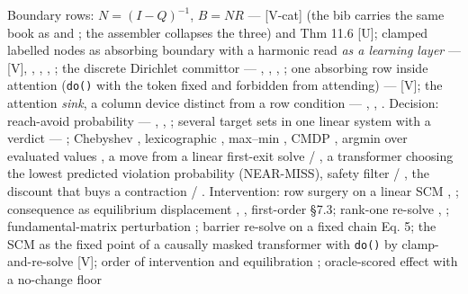 \documentclass[11pt,a4paper]{article}
\theoremstyle{plain}
\theoremstyle{definition}
\theoremstyle{remark}
\begin{document}
Boundary rows: \(N=(I-Q)^{-1}\), \(B=NR\) ---
\citep{kemeny-1960-finitemarkov} {[}V-cat{]} (the bib carries the same
book as \citep{kemeny-1976-finite} and \citep{kemeny-1976-finitemarkov};
the assembler collapses the three) and
\citep{grinstead-1997-probability} Thm 11.6 {[}U{]}; clamped labelled
nodes as absorbing boundary with a harmonic read \emph{as a learning
layer} --- \citep{zhu-2003-harmonic} {[}V{]},
\citep{zhou-2003-consistency}, \citep{wu-2012-partially-absorbing},
\citep{begga-2023-diffusion-jump}, \citep{azad-2022-harmonic-extension};
the discrete Dirichlet committor ---
\citep{metzner-2009-tpt-markov-jump}, \citep{e-2006-transition-paths},
\citep{e-2010-tptreview}, \citep{doyle-1984-electric}; one absorbing row
inside attention (\texttt{do()} with the token fixed and forbidden from
attending) --- \citep{karbalayghareh-2026-doformer} {[}V{]}; the
attention \emph{sink}, a column device distinct from a row condition ---
\citep{xiao-2023-attentionsinks}, \citep{gu-2024-sinkemerges},
\citep{ranmilo-2026-attentionsinks}. Decision: reach-avoid probability
--- \citep{summers-2010-reach-avoid}, \citep{abate-2008-reachability},
\citep{kariotoglou-2014-lp-reach-avoid}; several target sets in one
linear system with a verdict --- \citep{baier-2008-modelchecking};
Chebyshev \citep{vanmoffaert-2013-chebyshev}, lexicographic
\citep{yang-2026-lexisafe}, max--min \citep{park-2026-maxmin}, CMDP
\citep{altman-1999-cmdp}, argmin over evaluated values
\citep{bellman-1957-markovian}, a move from a linear first-exit solve
\citep{todorov-2006-lmdp} / \citep{todorov-2009-efficient}, a
transformer choosing the lowest predicted violation probability
\citep{jeddi-2021-lyapunovsafe} (NEAR-MISS), safety filter
\citep{hsu-2023-safetyfilter} / \citep{borquez-2023-lrf}, the discount
that buys a contraction \citep{fisac-2019-bridging} /
\citep{hsu-2021-reachavoidrl}. Intervention: row surgery on a linear SCM
\citep{pearl-2009-causality}, \citep{shimizu-2006-lingam}; consequence
as equilibrium displacement \citep{mooij-2013-ode2scm},
\citep{bongers-2021-cyclic}, first-order
\citep{bottou-2013-counterfactual} §7.3; rank-one re-solve
\citep{sherman-1950-inverse-adjustment}, \citep{hager-1989-updating};
fundamental-matrix perturbation \citep{schweitzer-1968-perturbation};
barrier re-solve on a fixed chain \citep{piray-2021-linearrl} Eq. 5; the
SCM as the fixed point of a causally masked transformer with
\texttt{do()} by clamp-and-re-solve \citep{scetbon-2024-fip} {[}V{]};
order of intervention and equilibration \citep{dash-2005-emc};
oracle-scored effect with a no-change floor
\end{document}
